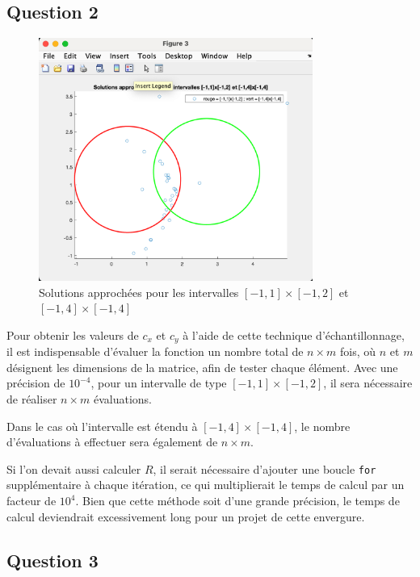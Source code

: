 \documentclass[12pt]{article}
\begin{document}
\subsection{Question 2}

\begin{figure}[H]
    \centering
    \includegraphics[width=0.8\textwidth]{Q2.png} 
    \caption{Solutions approchées pour les intervalles \([-1, 1] \times [-1, 2]\) et \([-1, 4] \times [-1, 4]\)}
\end{figure}
Pour obtenir les valeurs de \( c_x \) et \( c_y \) à l'aide de cette technique d’échantillonnage, il est indispensable d’évaluer la fonction un nombre total de \( n \times m \) fois, où \( n \) et \( m \) désignent les dimensions de la matrice, afin de tester chaque élément. Avec une précision de \( 10^{-4} \), pour un intervalle de type \([-1, 1] \times [-1, 2]\), il sera nécessaire de réaliser \( n \times m \) évaluations.

Dans le cas où l’intervalle est étendu à \([-1, 4] \times [-1, 4]\), le nombre d’évaluations à effectuer sera également de \( n \times m \).

Si l’on devait aussi calculer \( R \), il serait nécessaire d’ajouter une boucle \texttt{for} supplémentaire à chaque itération, ce qui multiplierait le temps de calcul par un facteur de \( 10^4 \). Bien que cette méthode soit d'une grande précision, le temps de calcul deviendrait excessivement long pour un projet de cette envergure.

\subsection{Question 3}
\end{document}
